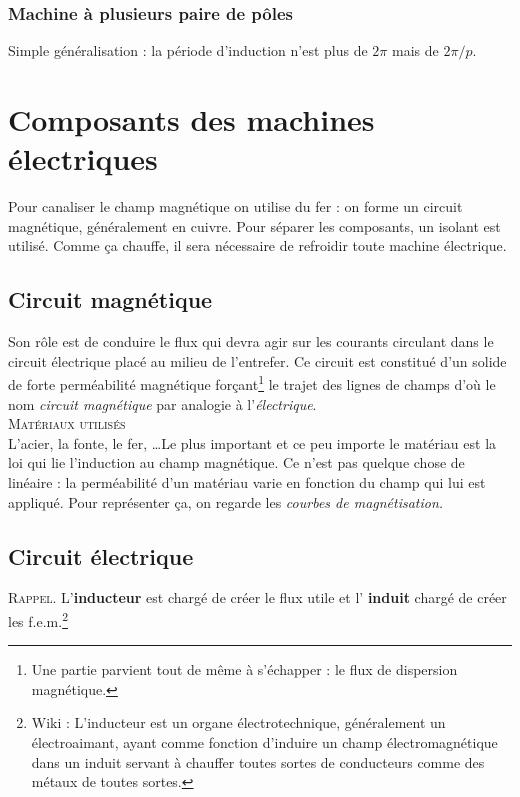 		\subsubsection{Machine à plusieurs paire de pôles}
		Simple généralisation : la période d'induction n'est plus de $2\pi$ mais 
		de $2\pi/p$.
		
		
		
\section{Composants des machines électriques}
Pour canaliser le champ magnétique on utilise du fer : on forme un circuit 
magnétique, généralement en cuivre. Pour séparer les composants, un isolant 
est utilisé. Comme ça chauffe, il sera nécessaire de refroidir toute machine 
électrique.

	\subsection{Circuit magnétique}
	Son rôle est de conduire le flux qui devra agir sur les courants circulant 
	dans le circuit électrique placé au milieu de l'entrefer. Ce circuit est 
	constitué d'un solide de forte perméabilité magnétique forçant\footnote{Une 
	partie parvient tout de même à s'échapper : le flux de dispersion magnétique.} 
	le trajet des lignes de champs d'où le nom \textit{circuit magnétique} par analogie 
	à l'\textit{électrique}.\\
	
	\textsc{Matériaux utilisés}\\
	L'acier, la fonte, le fer, \dots Le plus important et ce peu importe le 
	matériau est la loi qui lie l'induction au champ magnétique. Ce n'est 
	pas quelque chose de linéaire : la perméabilité d'un matériau varie en 
	fonction du champ qui lui est appliqué. Pour représenter ça, on regarde 
	les \textit{courbes de magnétisation.}
	
	
	\subsection{Circuit électrique}
	\textsc{Rappel.} L'\textbf{inducteur} est chargé de créer le flux utile et l'
	\textbf{induit} chargé de créer les f.e.m.\footnote{Wiki : L'inducteur est un organe 
	électrotechnique, généralement un électroaimant, ayant comme fonction d'induire 
	un champ électromagnétique dans un induit servant à chauffer toutes sortes de 
	conducteurs comme des métaux de toutes sortes.}
	
